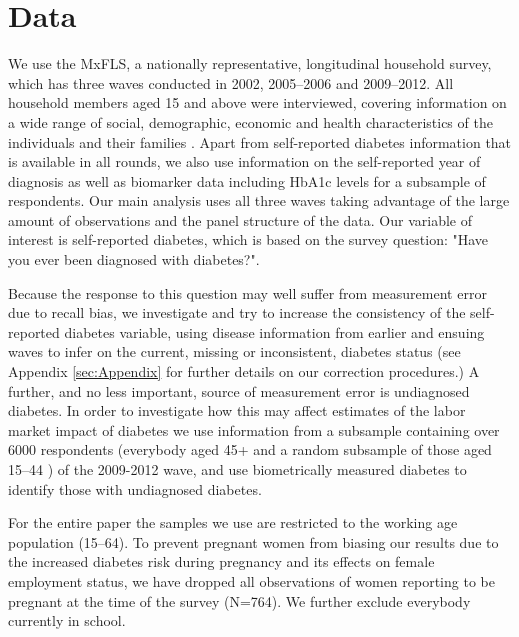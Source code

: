 \documentclass[12pt,english]{article}
\begin{document}
\section{\label{sec:Data}Data}

We use the \acf{MxFLS}, a nationally representative, longitudinal household survey, which has three waves conducted in 2002, 2005--2006 and 2009--2012. All household members aged 15 and above were interviewed, covering information on a wide range of social, demographic, economic and health characteristics of the individuals and their families \parencite{Rubalcava2013}. Apart from self-reported diabetes information that is available in all rounds, we also use information on the self-reported year of diagnosis as well as biomarker data including \ac{HbA1c} levels for a subsample of respondents.  Our main analysis uses all three waves taking advantage of the large amount of observations and the panel structure of the data. Our variable of interest is self-reported diabetes, which is based on the survey question: "Have you ever been diagnosed with diabetes?". 

Because the response to this question may well suffer from measurement error due to recall bias, we investigate and try to increase the consistency of the self-reported diabetes variable, using disease information from earlier and ensuing waves to infer on the current, missing or inconsistent, diabetes status (see Appendix \ref{sec:Appendix} for further details on our correction procedures.) A further, and no less important, source of measurement error is undiagnosed diabetes. In order to investigate how this may affect estimates of the labor market impact of diabetes we use information from a subsample containing over 6000 respondents (everybody aged 45+  and a random subsample of those aged 15--44 \parencite{Crimmins2015}) of the 2009-2012 wave, and use biometrically measured diabetes to identify those with undiagnosed diabetes. 

For the entire paper the samples we use are restricted to the working age population (15--64). To prevent pregnant women from biasing our results due to the increased diabetes risk during pregnancy and its effects on female employment status, we have dropped all observations of women reporting to be pregnant at the time of the survey (N=764). We further exclude everybody currently in school.
\end{document}
